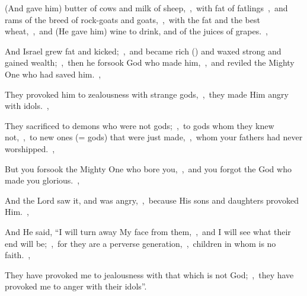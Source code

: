 \documentclass[12pt,twoside,a5paper]{article}
\begin{document}
\begin{normalparskip}
  (And gave him) butter of cows and milk of sheep,~\sep\ with fat of fatlings~\sep\ and rams of the breed of rock-goats and goats,~\sep\ with the fat and the best wheat,~\sep\ and (He gave him) wine to drink, and of the juices of grapes.~\sep

  And Israel grew fat and kicked;~\sep\ and became rich () and waxed strong and gained wealth;~\sep\ then he forsook God who made him,~\sep\ and reviled the Mighty One who had saved him.~\sep

  They provoked him to zealousness with strange gods,~\sep\ they made Him angry with idols.~\sep

  They sacrificed to demons who were not gods;~\sep\ to gods whom they knew not,~\sep\ to new ones (= gods) that were just made,~\sep\ whom your fathers had never worshipped.~\sep

  But you forsook the Mighty One who bore you,~\sep\ and you forgot the God who made you glorious.~\sep

  And the Lord saw it, and was angry,~\sep\ because His sons and daughters provoked Him.~\sep

  And He said, ``I will turn away My face from them,~\sep\ and I will see what their end will be;~\sep\ for they are a perverse generation,~\sep\ children in whom is no faith.~\sep

  They have provoked me to jealousness with that which is not God;~\sep\ they have provoked me to anger with their idols''.
\end{normalparskip}



\end{document}
